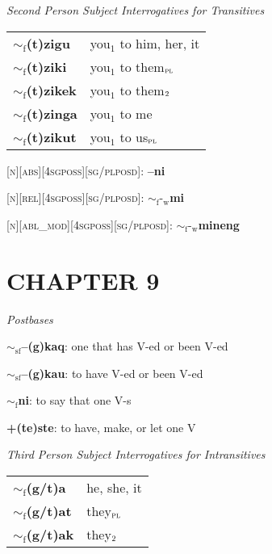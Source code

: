 \documentclass{article}
\begin{document}
\bigskip

\textit{Second Person Subject Interrogatives for Transitives}

\begin{tabular}{ l l }
\textbf{$\sim_\text{f}$(t)zigu} & you$_1$ to him, her, it\\
\textbf{$\sim_\text{f}$(t)ziki} & you$_1$ to them$_\text{\textsc{pl}}$ \\
\textbf{$\sim_\text{f}$(t)zikek} & you$_1$ to them$_\text{\textsc{2}}$ \\
\textbf{$\sim_\text{f}$(t)zinga} & you$_1$ to me \\
\textbf{$\sim_\text{f}$(t)zikut} & you$_1$ to us$_\text{\textsc{pl}}$
\end{tabular}

\bigskip

\textsc{[n][abs][4sgposs][sg/plposd]}: \textbf{--ni}

\textsc{[n][rel][4sgposs][sg/plposd]}: \textbf{$\sim_\text{f}\text{-}_\text{w}$mi}

\textsc{[n][abl\_mod][4sgposs][sg/plposd]}: \textbf{$\sim_\text{f}\text{-}_\text{w}$mineng}

\section{CHAPTER 9}

\textit{Postbases}
\begin{description}
\item \textbf{$\sim_\text{sf}$--(g)kaq}: one that has V-ed or been V-ed
\item \textbf{$\sim_\text{sf}$--(g)kau}: to have V-ed or been V-ed
\item \textbf{$\sim_\text{f}$ni}: to say that one V-s
\item \textbf{+(te)ste}: to have, make, or let one V
\end{description}

\bigskip

\textit{Third Person Subject Interrogatives for Intransitives}

\begin{tabular}{ l l }
\textbf{$\sim_\text{f}$(g/t)a} & he, she, it\\
\textbf{$\sim_\text{f}$(g/t)at} & they$_\text{\textsc{pl}}$ \\
\textbf{$\sim_\text{f}$(g/t)ak} & they$_\text{\textsc{2}}$ \\
\end{tabular}
\end{document}
